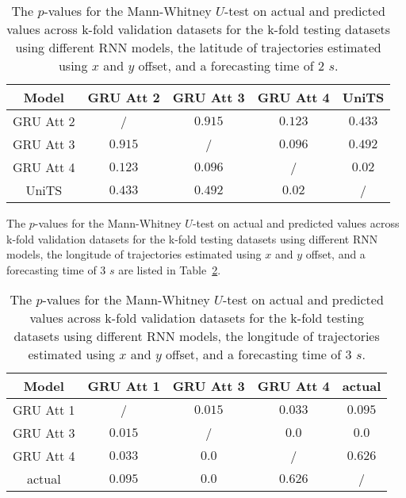 \begin{table}[!ht]
	\centering
	\begin{tabular}{|c|c|c|c|c|}
		\hline
		Model & GRU Att 2 & GRU Att 3 & GRU Att 4 & UniTS \\ \hline
		GRU Att 2 & / & $\mathbf{0.915}$ & $\mathbf{0.123}$ & $\mathbf{0.433}$ \\ \hline
		GRU Att 3 & $\mathbf{0.915}$ & / & $\mathbf{0.096}$ & $\mathbf{0.492}$ \\ \hline
		GRU Att 4 & $\mathbf{0.123}$ & $\mathbf{0.096}$ & / & $\mathbf{0.02}$ \\ \hline
		UniTS & $\mathbf{0.433}$ & $\mathbf{0.492}$ & $\mathbf{0.02}$ & / \\ \hline
	\end{tabular}
	\caption{The $p$-values for the Mann-Whitney $U$-test on actual and predicted values across k-fold validation datasets for the k-fold testing datasets using different RNN models, the latitude of trajectories estimated using $x$ and $y$ offset, and a forecasting time of $2$ $s$.}
	\label{tab:no:abs:p:lat:2}
\end{table}

The $p$-values for the Mann-Whitney $U$-test on actual and predicted values across k-fold validation datasets for the k-fold testing datasets using different RNN models, the longitude of trajectories estimated using $x$ and $y$ offset, and a forecasting time of $3$ $s$ are listed in Table~\ref{tab:no:abs:p:long:3}.

\begin{table}[!ht]
	\centering
	\begin{tabular}{|c|c|c|c|c|}
		\hline
		Model & GRU Att 1 & GRU Att 3 & GRU Att 4 & actual \\ \hline
		GRU Att 1 & / & $\mathbf{0.015}$ & $\mathbf{0.033}$ & $\mathbf{0.095}$ \\ \hline
		GRU Att 3 & $\mathbf{0.015}$ & / & $0.0$ & $0.0$ \\ \hline
		GRU Att 4 & $\mathbf{0.033}$ & $0.0$ & / & $\mathbf{0.626}$ \\ \hline
		actual & $\mathbf{0.095}$ & $0.0$ & $\mathbf{0.626}$ & / \\ \hline
	\end{tabular}
	\caption{The $p$-values for the Mann-Whitney $U$-test on actual and predicted values across k-fold validation datasets for the k-fold testing datasets using different RNN models, the longitude of trajectories estimated using $x$ and $y$ offset, and a forecasting time of $3$ $s$.}
	\label{tab:no:abs:p:long:3}
\end{table}

